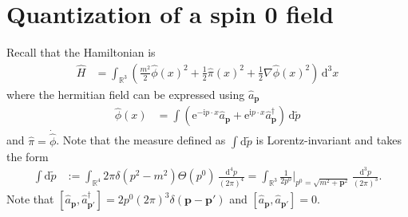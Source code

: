 \documentclass[english, parskip=full]{scrartcl}
\newcommand{\intr}{}
\newcommand{\kla}{}
\newcommand{\tecxt}{}
\renewcommand{\i}{\text{i}}
\newcommand{\e}{\text{e}}
\begin{document}
\section{Quantization of a spin 0 field}
Recall that the Hamiltonian is
\begin{align}
\hat{H} &= \intr\int_{\mathbb{R}^{3}} \kla\left( \frac{m^2}{2} \hat{\phi}(x)^2 + \frac{1}{2} \hat{\pi}(x)^2 + \frac{1}{2} \nabla\hat{\phi}(x)^2 \right) \, \mathrm{d}^{3}x
\end{align}
where the hermitian field can be expressed using $\hat{a}_\textbf{p}$
\begin{align}
\hat{\phi}(x) &= \int \kla\left( \e^{-\i p\cdot x} \hat{a}_\textbf{p} + \e^{\i p\cdot x} \hat{a}_\textbf{p}^\dagger \right) \, \mathrm{d}\tilde{p}
\end{align}
and $\hat{\pi} = \dot{\hat{\phi}}$.
Note that the measure defined as $\int \tecxt\text{d}\tilde{p}$ is Lorentz-invariant and takes the form
\begin{align}
\int \tecxt\text{d}\tilde{p} &:= \intr\int_{\mathbb{R}^{4}} 2\pi \delta(p^2 - m^2) \Theta(p^0) \, \frac{\mathrm{d}^{4}p}{(2\pi)^4} = \intr\int_{\mathbb{R}^{3}} \frac{1}{2p^0} \Big\vert_{p^0 = \sqrt{m^2 + \textbf{p}^2}} \, \frac{\mathrm{d}^{3}p}{(2\pi)^3}.
\end{align}
Note that $\left[ \hat{a}_\textbf{p}, \hat{a}_{\textbf{p}'}^\dagger \right] = 2p^0 (2\pi)^3 \delta(\textbf{p} - \textbf{p}')$ and $\left[ \hat{a}_\textbf{p}, \hat{a}_{\textbf{p}'} \right] = 0$.
\end{document}
